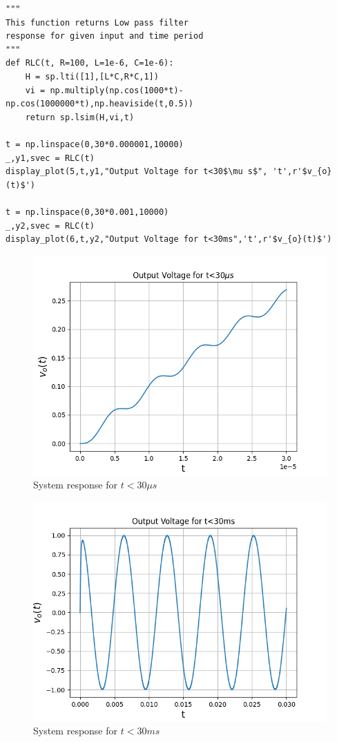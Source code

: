 \documentclass{article}
\begin{document}
\begin{lstlisting}
"""
This function returns Low pass filter 
response for given input and time period
"""
def RLC(t, R=100, L=1e-6, C=1e-6):
    H = sp.lti([1],[L*C,R*C,1])
    vi = np.multiply(np.cos(1000*t)-np.cos(1000000*t),np.heaviside(t,0.5))
    return sp.lsim(H,vi,t)

t = np.linspace(0,30*0.000001,10000)
_,y1,svec = RLC(t)
display_plot(5,t,y1,"Output Voltage for t<30$\mu s$", 't',r'$v_{o}(t)$')

t = np.linspace(0,30*0.001,10000)
_,y2,svec = RLC(t)
display_plot(6,t,y2,"Output Voltage for t<30ms",'t',r'$v_{o}(t)$')
\end{lstlisting}
\begin{figure}[h!]
\includegraphics[scale=0.6]{Figure_5}
\centering
\caption{System response for $t<30\mu s$}
\label{fig:Coupled Oscillations}
\end{figure}
\begin{figure}[h!]
\includegraphics[scale=0.6]{Figure_6}
\centering
\caption{System response for $t<30ms$}
\label{fig:Coupled Oscillations}
\end{figure}
\end{document}
